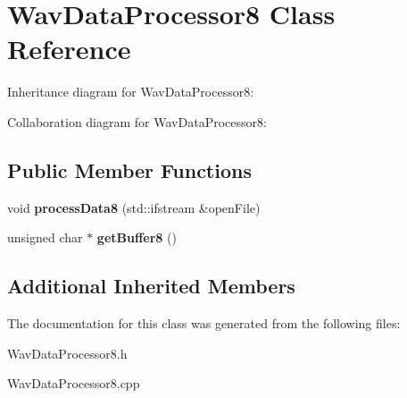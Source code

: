 \hypertarget{classWavDataProcessor8}{}\section{Wav\+Data\+Processor8 Class Reference}
\label{classWavDataProcessor8}


Inheritance diagram for Wav\+Data\+Processor8\+:


Collaboration diagram for Wav\+Data\+Processor8\+:
\subsection*{Public Member Functions}
\begin{DoxyCompactItemize}
\item 
\mbox{\label{classWavDataProcessor8_ad1b0b8b1543980adadac9309fe73169b}} 
void {\bfseries process\+Data8} (std\+::ifstream \&open\+File)
\item 
\mbox{\label{classWavDataProcessor8_ac1705aab5d1dc4d5575dd98136665dbd}} 
unsigned char $\ast$ {\bfseries get\+Buffer8} ()
\end{DoxyCompactItemize}
\subsection*{Additional Inherited Members}


The documentation for this class was generated from the following files\+:\begin{DoxyCompactItemize}
\item 
Wav\+Data\+Processor8.\+h\item 
Wav\+Data\+Processor8.\+cpp\end{DoxyCompactItemize}
